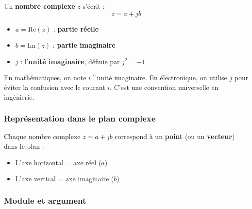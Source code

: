 \documentclass[12pt,a4paper,twoside]{book}
\begin{document}
Un \textbf{nombre complexe} $z$ s'écrit :
\[
z = a + jb
\]
\begin{itemize}[nosep]
\item $a = \text{Re}(z)$ : \textbf{partie réelle}
\item $b = \text{Im}(z)$ : \textbf{partie imaginaire}
\item $j$ : l'\textbf{unité imaginaire}, définie par $j^2 = -1$
\end{itemize}

\begin{attention}
En mathématiques, on note $i$ l'unité imaginaire. En électronique, on utilise $j$ pour éviter la confusion avec le courant $i$. C'est une convention universelle en ingénierie.
\end{attention}

\subsubsection*{Représentation dans le plan complexe}

Chaque nombre complexe $z = a + jb$ correspond à un \textbf{point} (ou un \textbf{vecteur}) dans le plan :
\begin{itemize}[nosep]
\item L'axe horizontal = axe réel ($a$)
\item L'axe vertical = axe imaginaire ($b$)
\end{itemize}

\begin{center}
\end{center}

\subsubsection*{Module et argument}
\end{document}
